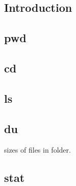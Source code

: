 
\subsection{Introduction}

\subsection{pwd}

\subsection{cd}

\subsection{ls}

\subsection{du}
sizes of files in folder.

\subsection{stat}

